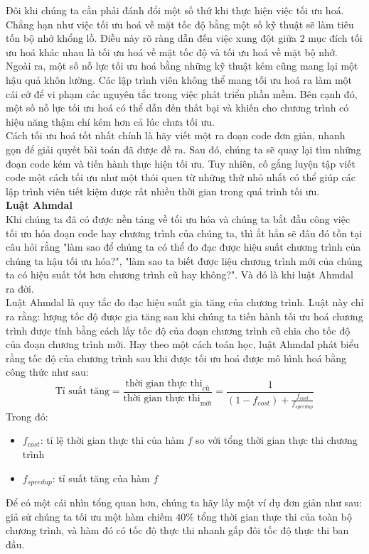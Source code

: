 \documentclass{article}
\begin{document}
Đôi khi chúng ta cần phải đánh đổi một số thứ khi thực hiện việc tối ưu hoá. Chẳng hạn như việc tối ưu hoá về mặt tốc độ bằng một số kỹ thuật sẽ làm tiêu tốn bộ nhớ khổng lồ. Điều này rõ ràng dẫn đến việc xung đột giữa 2 mục đích tối ưu hoá khác nhau là tối ưu hoá về mặt tốc độ và tối ưu hoá về mặt bộ nhớ. Ngoài ra, một số nỗ lực tối ưu hoá bằng những kỹ thuật kém cũng mang lại một hậu quả khôn lường. Các lập trình viên không thể mang tối ưu hoá ra làm một cái cớ để vi phạm các nguyên tắc trong việc phát triển phần mềm. Bên cạnh đó, một số nỗ lực tối ưu hoá có thể dẫn đến thất bại và khiến cho chương trình có hiệu năng thậm chí kém hơn cả lúc chưa tối ưu.\\

Cách tối ưu hoá tốt nhất chính là hãy viết một ra đoạn code đơn giản, nhanh gọn để giải quyết bài toán đã được đề ra. Sau đó, chúng ta sẽ quay lại tìm những đoạn code kém và tiến hành thực hiện tối ưu. Tuy nhiên, cố gắng luyện tập viết code một cách tối ưu như một thói quen từ những thứ nhỏ nhất có thể giúp các lập trình viên tiết kiệm được rất nhiều thời gian trong quá trình tối ưu.\\

{\large \textbf{Luật Ahmdal}}\\

Khi chúng ta đã có được nền tảng về tối ưu hóa và chúng ta bắt đầu công việc tối ưu hóa đoạn code hay chương trình của chúng ta, thì ắt hẳn sẽ đâu đó tồn tại câu hỏi rằng "làm sao để chúng ta có thể đo đạc được hiệu suất chương trình của chúng ta hậu tối ưu hóa?", "làm sao ta biết được liệu chương trình mới của chúng ta có hiệu suất tốt hơn chương trình cũ hay không?". Và đó là khi luật Ahmdal ra đời.\\

Luật Ahmdal là quy tắc đo đạc hiệu suất gia tăng của chương trình. Luật này chỉ ra rằng: lượng tốc độ được gia tăng sau khi chúng ta tiến hành tối ưu hoá chương trình được tính bằng cách lấy tốc độ của đoạn chương trình cũ chia cho tốc độ của đoạn chương trình mới. Hay theo một cách toán học, luật Ahmdal phát biểu rằng tốc độ của chương trình sau khi được tối ưu hoá được mô hình hoá bằng công thức như sau:
\begin{equation}
     \text{Tỉ suất tăng} = \frac{\text{thời gian thực thi}_\text{cũ}}{\text{thời gian thực thi}_\text{mới}} = \frac{1}{\left(1 - f_{cost}\right) + \frac{f_{cost}}{{f_{speedup}}}}
\end{equation}
Trong đó:
\begin{itemize}
    \item $f_{cost}$: tỉ lệ thời gian thực thi của hàm $f$ so với tổng thời gian thực thi chương trình
    \item $f_{speedup}$: tỉ suất tăng của hàm $f$
\end{itemize}
Để có một cái nhìn tổng quan hơn, chúng ta hãy lấy một ví dụ đơn giản như sau: giả sử chúng ta tối ưu một hàm chiếm $40\%$ tổng thời gian thực thi của toàn bộ chương trình, và hàm đó có tốc độ thực thi nhanh gấp đôi tốc độ thực thi ban đầu.\\ 
\end{document}

